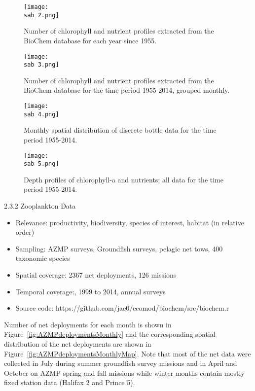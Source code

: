 \documentclass[letterpaper,portrait,11pt]{scrartcl}
\numberwithin{equation}{section}		%
\numberwithin{figure}{section}		%
\numberwithin{table}{section}				%
\newcommand{\ecomod}{\string~/ecomod_data/}   %
\newcommand{\sab}{\ecomod/mpa/sab/}   %
\begin{document}
\begin{figure}
  \centering
  \texttt{[image: \\sab 2.png]}
  \caption{Number of chlorophyll and nutrient profiles extracted from the BioChem database for each year since 1955.}
    \label{fig:ChloroMap}
\end{figure}

\begin{figure}
  \centering
  \texttt{[image: \\sab 3.png]}
  \caption{Number of chlorophyll and nutrient profiles extracted from the BioChem database for the time period 1955-2014, grouped monthly.}
    \label{fig:ChloroFreq}
\end{figure}

\begin{figure}[h]
  \centering
  \texttt{[image: \\sab 4.png]}
  \caption{Monthly spatial distribution of discrete bottle data for the time period 1955-2014.}
   \label{fig:BottleMap}
\end{figure}

\begin{figure}
  \centering
  \texttt{[image: \\sab 5.png]}
  \caption{Depth profiles of chlorophyll-a and nutrients; all data for the time period 1955-2014.}
    \label{fig:ChloroProfiles}
\end{figure}


2.3.2  Zooplankton Data

\begin{itemize}  
  \item Relevance:  productivity, biodiversity, species of interest, habitat (in relative order)
  \item Sampling:  AZMP surveys, Groundfish surveys, pelagic net tows, 400 taxonomic species
  \item Spatial coverage: 2367 net deployments, 126 missions 
  \item Temporal coverage:,  1999 to 2014, annual surveys
  \item Source code: https://github.com/jae0/ecomod/biochem/src/biochem.r
\end{itemize}

Number of net deployments for each month is shown in Figure~\ref{fig:AZMPdeploymentsMonthly} and the corresponding spatial distribution of the net deployments are shown in Figure~\ref{fig:AZMPdeploymentsMonthlyMap}. Note that most of the net data were collected in July during summer groundfish survey missions and in April and October on AZMP spring and fall missions while winter months contain mostly fixed station data (Halifax 2 and Prince 5).
\end{document}
